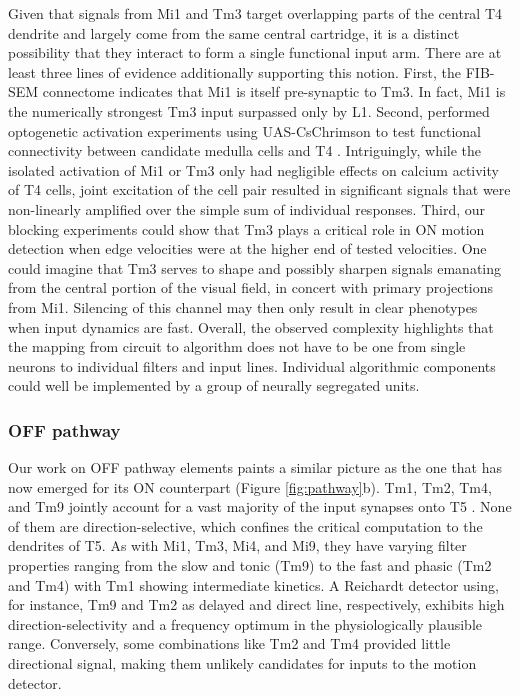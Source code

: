 Given that signals from Mi1 and Tm3 target overlapping parts of the central T4 dendrite and largely come from the same central cartridge, it is a distinct possibility that they interact to form a single functional input arm. There are at least three lines of evidence additionally supporting this notion. First, the FIB-SEM connectome indicates that Mi1 is itself pre-synaptic to Tm3. In fact, Mi1 is the numerically strongest Tm3 input surpassed only by L1. Second, \citet{Strother:2017aa} performed optogenetic activation experiments using UAS-CsChrimson to test functional connectivity between candidate medulla cells and T4 \citep{Klapoetke:2014aa}. Intriguingly, while the isolated activation of Mi1 or Tm3 only had negligible effects on calcium activity of T4 cells, joint excitation of the cell pair resulted in significant signals that were non-linearly amplified over the simple sum of individual responses. Third, our blocking experiments could show that Tm3 plays a critical role in ON motion detection when edge velocities were at the higher end of tested velocities. One could imagine that Tm3 serves to shape and possibly sharpen signals emanating from the central portion of the visual field, in concert with primary projections from Mi1. Silencing of this channel may then only result in clear phenotypes when input dynamics are fast. Overall, the observed complexity highlights that the mapping from circuit to algorithm does not have to be one from single neurons to individual filters and input lines. Individual algorithmic components could well be implemented by a group of neurally segregated units.

\subsubsection{OFF pathway}
Our work on OFF pathway elements paints a similar picture as the one that has now emerged for its ON counterpart (Figure \ref{fig:pathway}b). Tm1, Tm2, Tm4, and Tm9 jointly account for a vast majority of the input synapses onto T5 \citep{Shinomiya:2014dx}. None of them are direction-selective, which confines the critical computation to the dendrites of T5. As with Mi1, Tm3, Mi4, and Mi9, they have varying filter properties ranging from the slow and tonic (Tm9) to the fast and phasic (Tm2 and Tm4) with Tm1 showing intermediate kinetics. A Reichardt detector using, for instance, Tm9 and Tm2 as delayed and direct line, respectively, exhibits high direction-selectivity and a frequency optimum in the physiologically plausible range. Conversely, some combinations like Tm2 and Tm4 provided little directional signal, making them unlikely candidates for inputs to the motion detector.

